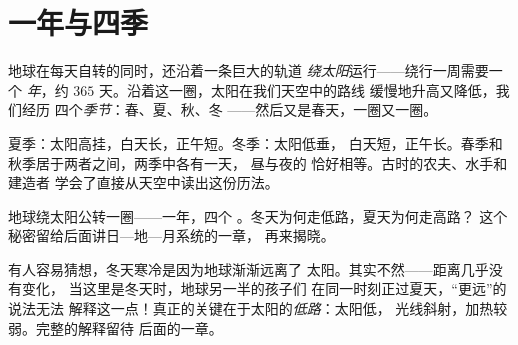\section{一年与四季}

\begin{definition}[一年与四季]\label{def:g3:sun-days-seasons:year}
地球在每天自转的同时，还沿着一条巨大的轨道
\emph{绕太阳}运行——绕行一周需要一个
\emph{年}，约 $365$ 天。沿着这一圈，太阳在我们天空中的路线
缓慢地升高又降低，我们经历
四个\emph{季节}：春、夏、秋、冬
——然后又是春天，一圈又一圈。
\end{definition}

\begin{example}[四季]\label{ex:g3:sun-days-seasons:quarters}
夏季：太阳高挂，白天长，正午短。冬季：太阳低垂，
白天短，正午长。春季和秋季居于两者之间，两季中各有一天，
昼与夜的
恰好相等。古时的农夫、水手和建造者
学会了直接从天空中读出这份历法。
\end{example}

\begin{omfigure}

{\small 地球绕太阳公转一圈——一年，四个
。冬天为何走低路，夏天为何走高路？
这个秘密留给后面讲日—地—月系统的一章，
再来揭晓。}
\end{omfigure}

\begin{remark}[冬天并非“更远”]\label{rem:g3:sun-days-seasons:notfarther}
有人容易猜想，冬天寒冷是因为地球渐渐远离了
太阳。其实不然——距离几乎没有变化，
当这里是冬天时，地球另一半的孩子们
在同一时刻正过夏天，“更远”的说法无法
解释这一点！真正的关键在于太阳的\emph{低路}：太阳低，
光线斜射，加热较弱。完整的解释留待
后面的一章。
\end{remark}

